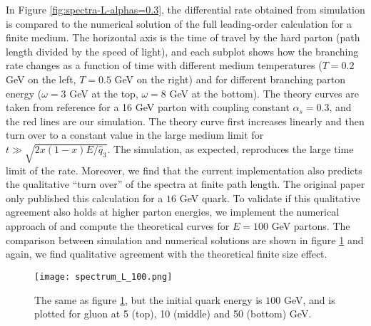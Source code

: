 In Figure \ref{fig:spectra-L-alphas=0.3}, the differential rate obtained from simulation is compared to the numerical solution of the full leading-order calculation for a finite medium.
The horizontal axis is the time of travel by the hard parton (path length divided by the speed of light), and each subplot shows how the branching rate changes as a function of time with different medium temperatures ($T=0.2$ GeV on the left, $T=0.5$ GeV on the right) and for different branching parton energy ($\omega=3$ GeV at the top, $\omega=8$ GeV at the bottom).
The theory curves are taken from reference \cite{CaronHuot:2010bp} for a 16 GeV parton with coupling constant $\alpha_s = 0.3$, and the red lines are our simulation.
The theory curve first increases linearly and then turn over to a constant value in the large medium limit for $t \gg \sqrt{2x(1-x)E/\hat{q}_3}$.
The simulation, as expected, reproduces the large time limit of the rate.
Moreover, we find that the current implementation also predicts the qualitative ``turn over'' of the spectra at finite path length.
The original paper only published this calculation for a $16$ GeV quark. 
To validate if this qualitative agreement also holds at higher parton energies, we implement the numerical approach of \cite{CaronHuot:2010bp} and compute the theoretical curves for $E=100$ GeV partons.
The comparison between simulation and numerical solutions are shown in figure \ref{fig:spectra-L-alphas=0.3-E100} and again, we find qualitative agreement with the theoretical finite size effect.

\begin{figure}
\singlespacing
\centering
\texttt{[image: spectrum\_L\_100.png]}
\caption[The same as figure \ref{fig:spectra-L-alphas=0.3-E100}, but the initial quark energy is $100$ GeV,]{The same as figure \ref{fig:spectra-L-alphas=0.3-E100}, but the initial quark energy is $100$ GeV, and is plotted for gluon at 5 (top), 10 (middle) and 50 (bottom) GeV.}
\label{fig:spectra-L-alphas=0.3-E100}
\end{figure}

